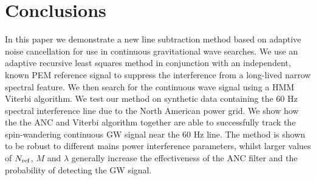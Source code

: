 \documentclass[pra,superscriptaddress,reprint,amsmath,amssymb,nofootinbib]{revtex4-2}
\begin{document}
\section{Conclusions}\label{sec:conclusions}
In this paper we demonstrate a new line subtraction method based on adaptive noise cancellation for use in continuous gravitational wave searches. We use an adaptive recursive least squares method in conjunction with an independent, known PEM reference signal to suppress the interference from a long-lived narrow spectral feature. We then search for the continuous wave signal using a HMM Viterbi algorithm. We test our method on synthetic data containing the 60 Hz spectral interference line due to the North American power grid. We show how the the ANC and Viterbi algorithm together are able to successfully track the spin-wandering continuous GW signal near the 60 Hz line. The method is shown to be robust to different mains power interference parameters, whilst larger values of $N_{\rm ref}$, $M$ and $\lambda$ generally increase the effectiveness of the ANC filter and the probability of detecting the GW signal.





%


\newpage 
\newpage 

\appendix


\end{document}
